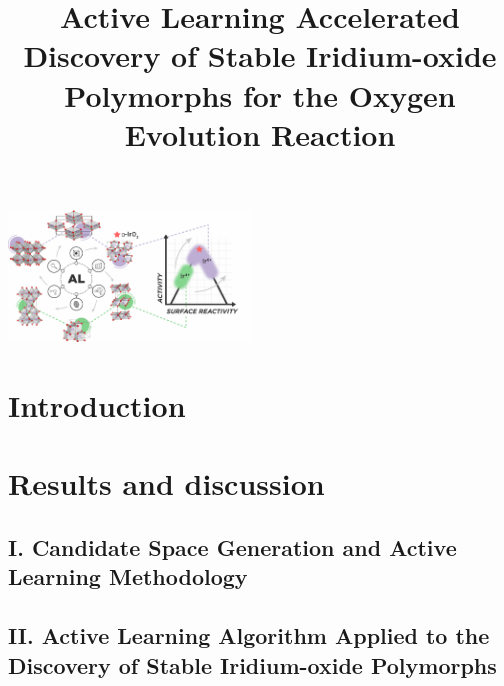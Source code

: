 \documentclass[%
  journal=cmatex,  %
  manuscript=article,
  ]{achemso}
\title[ML discovered \IrOx phases]{
Active Learning Accelerated Discovery of Stable Iridium-oxide Polymorphs for the Oxygen Evolution Reaction
}
\begin{document}
\begin{tocentry}
\begin{center}
\includegraphics[height=3.5cm]{02_figures/toc_figure/Raul_TOC__v1__v0__1200dpi.png}
\end{center}
\end{tocentry}



\newpage
\begin{abstract}

\end{abstract}
\newpage

\section{Introduction}


\section{Results and discussion}

  \subsection{I. Candidate Space Generation and Active Learning Methodology}
  

  \subsection{II. Active Learning Algorithm Applied to the Discovery of Stable Iridium-oxide Polymorphs}
  
\end{document}
